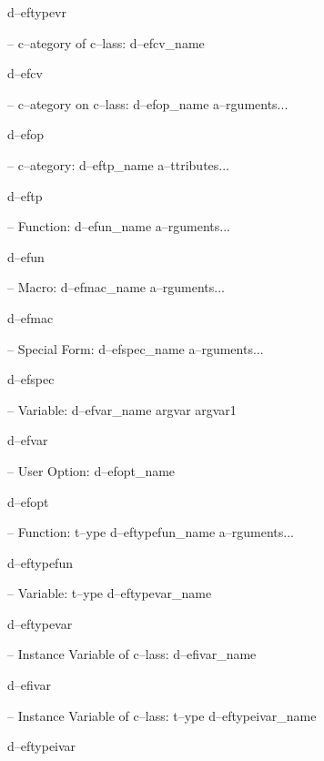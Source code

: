 \documentclass{book}
\begin{document}
\begin{titlepage}
%
d--eftypevr

\hbox{}-- c--ategory of c--lass: d--efcv\_name


%
d--efcv

\hbox{}-- c--ategory on c--lass: d--efop\_name a--rguments...


%
d--efop

\hbox{}-- c--ategory: d--eftp\_name a--ttributes...


%
d--eftp

\hbox{}-- Function: d--efun\_name a--rguments...


%
d--efun

\hbox{}-- Macro: d--efmac\_name a--rguments...


%
d--efmac

\hbox{}-- Special Form: d--efspec\_name a--rguments...


%
d--efspec

\hbox{}-- Variable: d--efvar\_name argvar argvar1


%
d--efvar

\hbox{}-- User Option: d--efopt\_name


%
d--efopt

\hbox{}-- Function: t--ype d--eftypefun\_name a--rguments...


%
d--eftypefun

\hbox{}-- Variable: t--ype d--eftypevar\_name


%
d--eftypevar

\hbox{}-- Instance Variable of c--lass: d--efivar\_name


%
d--efivar

\hbox{}-- Instance Variable of c--lass: t--ype d--eftypeivar\_name


%
d--eftypeivar


\end{titlepage}
\end{document}
